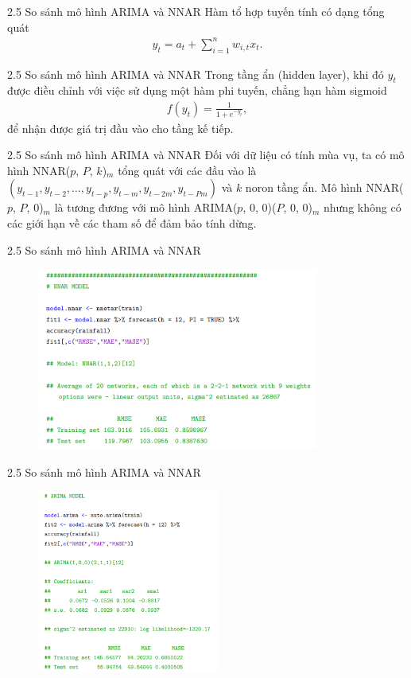 \documentclass[notheorems,envcountsect,hyperref=unicode]{beamer}
\begin{document}
\begin{frame}{2.5 So sánh mô hình ARIMA và NNAR}
Hàm tổ hợp tuyến tính có dạng tổng quát
\begin{align*}
y_t = a_t + \sum_{i =1}^{n}w_{i, t}x_t.
\end{align*}
\end{frame}

\begin{frame}{2.5 So sánh mô hình ARIMA và NNAR}
Trong tầng ẩn (hidden layer), khi đó $y_t$ được điều chỉnh với việc sử dụng một hàm phi tuyến, chẳng hạn hàm sigmoid
\begin{align*}
f(y_t) = \frac{1}{1+e^{-y_t}},
\end{align*}
để nhận được giá trị đầu vào cho tầng kế tiếp.
\end{frame}

\begin{frame}{2.5 So sánh mô hình ARIMA và NNAR}
Đối với dữ liệu có tính mùa vụ, ta có mô hình NNAR($p$, $P$, $k$)$_m$ tổng quát với các đầu vào là $(y_{t-1}, y_{t-2},\dots, y_{t-p}, y_{t-m}, y_{t-2m}, y_{t-Pm})$ và $k$ noron tầng ẩn. Mô hình NNAR($p$, $P$, 0)$_m$ là tương đương với mô hình ARIMA($p$, 0, 0)($P$, 0, 0)$_m$ nhưng không có các giới hạn về các tham số để đảm bảo tính dừng.
\end{frame}

\begin{frame}{2.5 So sánh mô hình ARIMA và NNAR}
	\begin{figure}[!htb]
		\centering
		\includegraphics[width=1\linewidth,height=6cm]{duong11} 
	\end{figure}
\end{frame}

\begin{frame}{2.5 So sánh mô hình ARIMA và NNAR}
	\begin{figure}[!htb]
		\centering
		\includegraphics[width=1\linewidth,height=6cm]{duong12} 
	\end{figure}
\end{frame}
\end{document}
